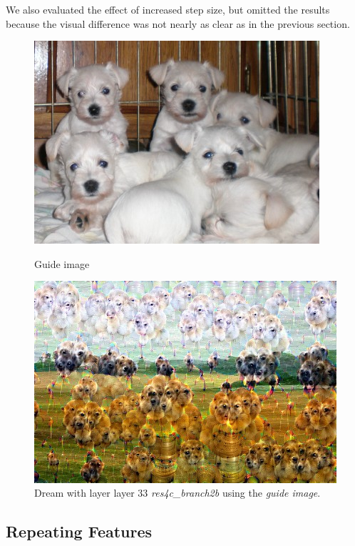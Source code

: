 We also evaluated the effect of increased step size, but omitted the results because the visual difference was not nearly as clear as in the previous section.

\begin{figure}[H]
	\centering
	\includegraphics[width=1\linewidth]{img/guide.jpg}
	\caption{Guide image\cite{imgpuppies}}
	\label{fig:guide}
	\endminipage\hfill
	\centering
	\includegraphics[width=1\linewidth]{img/guide_dream.jpg}
	\caption{Dream with layer layer 33 \emph{res4c\_branch2b} using the \emph{guide image}.}
	\label{fig:guide_dream}
	\endminipage\hfill
\end{figure}



\subsection{Repeating Features}
\label{sec:repeating-features}

